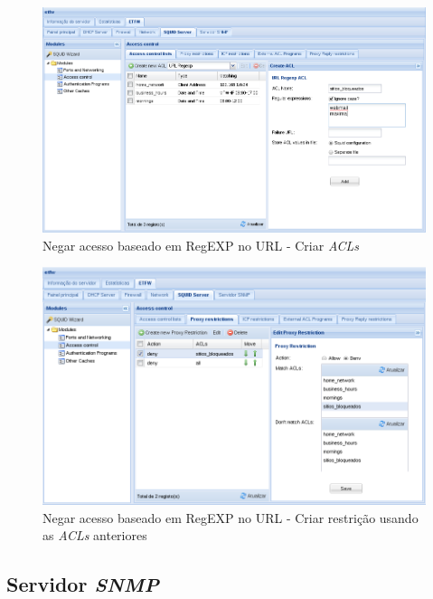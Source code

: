 \begin{figure}[H]
    \begin{center}
    \includegraphics[scale=0.38]{screenshots/etfw/etfw_squid_example_urlregexp_01.png}
    \caption{Negar acesso baseado em RegEXP no URL - Criar \textit{ACLs}}
    \label{fig:etfw_squid_example_urlregexp_01}
    \end{center}
\end{figure}

\begin{figure}[H]
    \begin{center}
    \includegraphics[scale=0.38]{screenshots/etfw/etfw_squid_example_urlregexp_02.png}
    \caption{Negar acesso baseado em RegEXP no URL - Criar restrição usando as \textit{ACLs} anteriores}
    \label{fig:etfw_squid_example_urlregexp_02}
    \end{center}
\end{figure}

\subsection{Servidor \textit{SNMP}}

